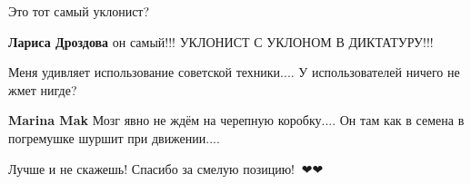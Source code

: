 \begin{itemize}
 
Это тот самый уклонист?

\begin{itemize}
 
\textbf{Лариса Дроздова} он самый!!! УКЛОНИСТ С УКЛОНОМ В ДИКТАТУРУ!!!
\end{itemize}

 
Меня удивляет использование советской техники.... У использователей ничего не
жмет нигде?

\begin{itemize}
 
\textbf{Marina Mak} Мозг явно не ждём на черепную коробку....
Он там как в семена в погремушке шуршит при движении....
\end{itemize}

 
Лучше и не скажешь! Спасибо за смелую позицию!🥰💝❤❤

\begin{itemize}
 

\end{itemize}
\end{itemize}
